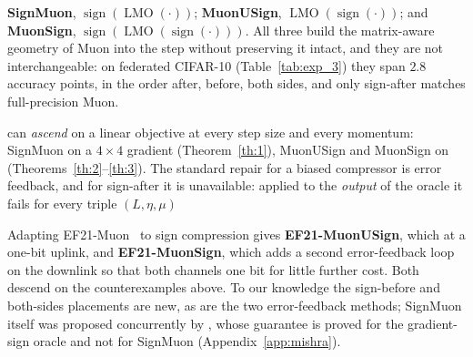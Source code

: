  \textbf{SignMuon}, $\operatorname{sign}(\operatorname{LMO}(\cdot))$; \textbf{MuonUSign}, $\operatorname{LMO}(\operatorname{sign}(\cdot))$; and \textbf{MuonSign}, $\operatorname{sign}(\operatorname{LMO}(\operatorname{sign}(\cdot)))$. All three build the matrix-aware geometry of Muon into the step without preserving it intact, and they are not interchangeable: on federated CIFAR-10 (Table~\ref{tab:exp_3}) they span $2.8$ accuracy points, in the order after, before, both sides, and only sign-after matches full-precision Muon.

 can \emph{ascend} on a linear objective at every step size and every momentum: SignMuon on a $4\times4$ gradient (Theorem~\ref{th:1}), MuonUSign and MuonSign on  (Theorems~\ref{th:2}--\ref{th:3}). The standard repair for a biased compressor is error feedback, and for sign-after it is unavailable: applied to the \emph{output} of the oracle it fails for every triple $(L,\eta,\mu)$

 Adapting EF21-Muon~\citep{gruntkowska2025error} to sign compression gives \textbf{EF21-MuonUSign}, which  at a one-bit uplink, and \textbf{EF21-MuonSign}, which adds a second error-feedback loop on the downlink so that both channels  one bit for little further cost. Both descend on the counterexamples above. To our knowledge the sign-before and both-sides placements are new, as are the two error-feedback methods; SignMuon itself was proposed concurrently by \citet{mishra2026signmuon}, whose guarantee is proved for the gradient-sign oracle and not for SignMuon (Appendix~\ref{app:mishra}).


